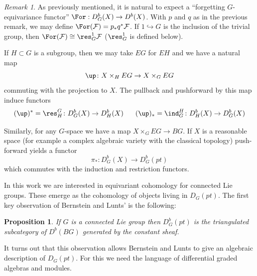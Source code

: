 \documentclass[12pt]{wart}
\newtheorem{prop}[thm]{Proposition}
\theoremstyle{remark}
\newtheorem{remark}{Remark}
\begin{document}
\begin{remark} As previously mentioned, it is natural to expect a
  ``forgetting $G$-equivariance functor'' $\For : D^b_G(X) \to
  D^b(X)$. With $p$ and $q$ as in the previous remark, we may define
  $\For(\mathcal{F}) = p_*q^*\mathcal{F}$. If $1 \hookrightarrow G$ is
  the inclusion of the trivial group, then $\For(\mathcal{F}) \cong
  \res_G^1 \mathcal{F}$ ($\res_G^1$ is defined below). \end{remark}

  If $H\subset G$ is a subgroup, then we may take $EG$ for $EH$ and we
  have a natural map
\begin{equation*}
\up\colon X\times_H EG\to X\times_G EG
\end{equation*}
commuting with the projection
to $X$.
The pullback and pushforward by this map induce functors
\begin{equation*}
  (\up)^*=\res^G_H\colon D^b_G(X)\to D^b_H(X)\hspace{6mm}(\up)_*=\ind_G^H\colon D^b_H(X)\to D^b_G(X)
\end{equation*}

Similarly, for any $G$-space we have a map $X \times_G EG \to BG$. If $X$ is a reasonable space (for example a complex algebraic variety with the classical topology) push-forward yields a functor
\begin{displaymath}
\pi_* : D^b_G(X) \to D^b_G(pt)
\end{displaymath}
which commutes with the induction and restriction functors.

In this work we are interested in equivariant cohomology for connected Lie
groups. These emerge as the cohomology of objects living in
$D_G(pt)$. The first key observation of Bernstein and Lunts' is
the following:

\begin{prop} If $G$ is a connected Lie group then $D^b_G(pt)$ is the triangulated subcategory of $D^b(BG)$ generated by the constant sheaf. \end{prop}

It turns out that this observation allows Bernstein and Lunts to give an algebraic description of $D_G(pt)$. For this we need the language of differential graded algebras and modules.
\end{document}

